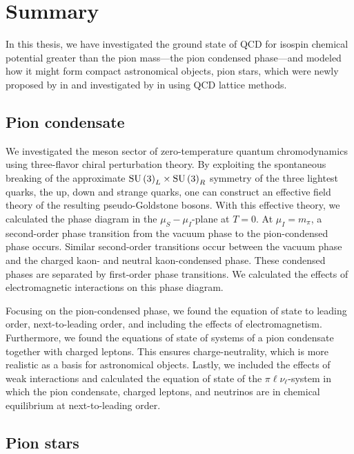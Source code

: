 \section{Summary}


In this thesis, we have investigated the ground state of QCD for isospin chemical potential greater than the pion mass---the pion condensed phase---and modeled how it might form compact astronomical objects, pion stars, which were newly proposed by \citeauthor{carignanoScrutinizingPionCondensed2017} in \autocite{carignanoScrutinizingPionCondensed2017} and investigated by \citeauthor{brandtNewClassCompact2018} in \autocite{brandtNewClassCompact2018} using QCD lattice methods.


\subsection{Pion condensate}

We investigated the meson sector of zero-temperature quantum chromodynamics using three-flavor chiral perturbation theory.
By exploiting the spontaneous breaking of the approximate $\text{SU}\left(3\right)_L\times\text{SU}\left(3\right)_R$ symmetry of the three lightest quarks, the up, down and strange quarks, one can construct an effective field theory of the resulting pseudo-Goldstone bosons.
With this effective theory, we calculated the phase diagram in the $\mu_S-\mu_I$-plane at $T = 0$.
At $\mu_I = m_\pi$, a second-order phase transition from the vacuum phase to the pion-condensed phase occurs.
Similar second-order transitions occur between the vacuum phase and the charged kaon- and neutral kaon-condensed phase.
These condensed phases are separated by first-order phase transitions.
We calculated the effects of electromagnetic interactions on this phase diagram.

Focusing on the pion-condensed phase, we found the equation of state to leading order, next-to-leading order, and including the effects of electromagnetism.
Furthermore, we found the equations of state of systems of a pion condensate together with charged leptons.
This ensures charge-neutrality, which is more realistic as a basis for astronomical objects.
Lastly, we included the effects of weak interactions and calculated the equation of state of the $\pi\ell\nu_\ell$-system in which the pion condensate, charged leptons, and neutrinos are in chemical equilibrium at next-to-leading order.


\subsection{Pion stars}

